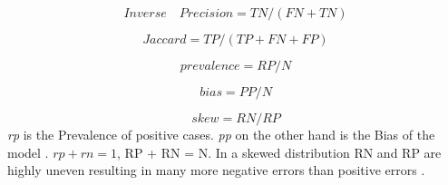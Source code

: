\documentclass[english,12pt,a4paper,pdftex,elec,utf8, table]{aaltothesis}
\begin{document}
\begin{equation}\label{inverseprecision}
Inverse\quad Precision = TN / (FN + TN)
\end{equation}

\begin{equation}\label{jaccard}
Jaccard = TP / (TP + FN + FP)
\end{equation}

\begin{equation}\label{prevalence}
prevalence = RP / N
\end{equation}

\begin{equation}\label{bias}
bias = PP / N
\end{equation}

\begin{equation}\label{skew}
skew = RN / RP
\end{equation}
\emph{rp} is the Prevalence of positive cases. \emph{pp} on the other hand is the Bias of the model \cite{lafferty2001conditional}. $rp + rn = 1$, RP + RN = N. In a skewed distribution RN and RP are highly uneven resulting in many more negative errors than positive errors \cite{POWERS2011}.
\end{document}

